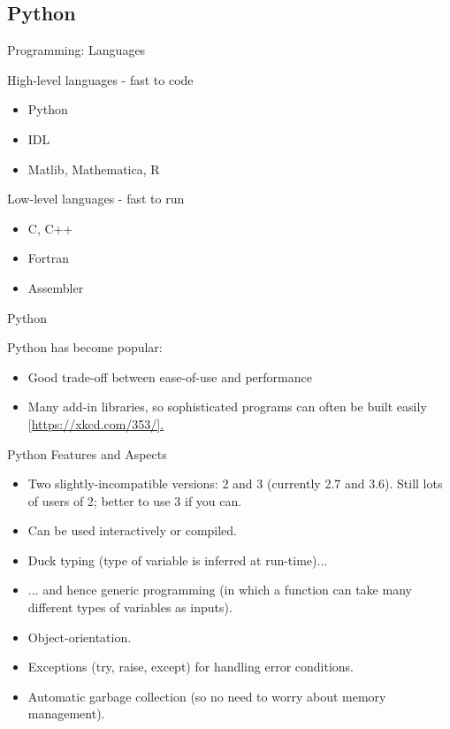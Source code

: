 \documentclass{beamer}
\begin{document}
\subsection{Python}


\begin{frame}{Programming: Languages}
  \begin{block}{High-level languages - fast to code}
    \begin{itemize}
      \item Python
      \item IDL
      \item Matlib, Mathematica, R
    \end{itemize}
    \end{block}
    \begin{block}{Low-level languages - fast to run}
    \begin{itemize}
      \item C, C++
      \item Fortran
      \item Assembler
    \end{itemize}
  \end{block}
\end{frame}

\begin{frame}{Python}
  \begin{block}{Python has become popular:}
    \begin{itemize}
      \item Good trade-off between ease-of-use and performance
      \item Many add-in libraries, so sophisticated programs can often be built easily [\url{https://xkcd.com/353/].}
    \end{itemize}
  \end{block}
\end{frame}

\begin{frame}{Python Features and Aspects}
  \begin{itemize}
    \item Two slightly-incompatible versions: 2 and 3 (currently 2.7 and 3.6). Still lots of users of 2; better to use 3 if you can.
    \item Can be used interactively or compiled.
    \item Duck typing (type of variable is inferred at run-time)...
    \item ... and hence generic programming (in which a function can take many different types of variables as inputs).
    \item Object-orientation.
    \item Exceptions (try, raise, except) for handling error conditions.
    \item Automatic garbage collection (so no need to worry about memory management).
  \end{itemize}
\end{frame}
\end{document}
